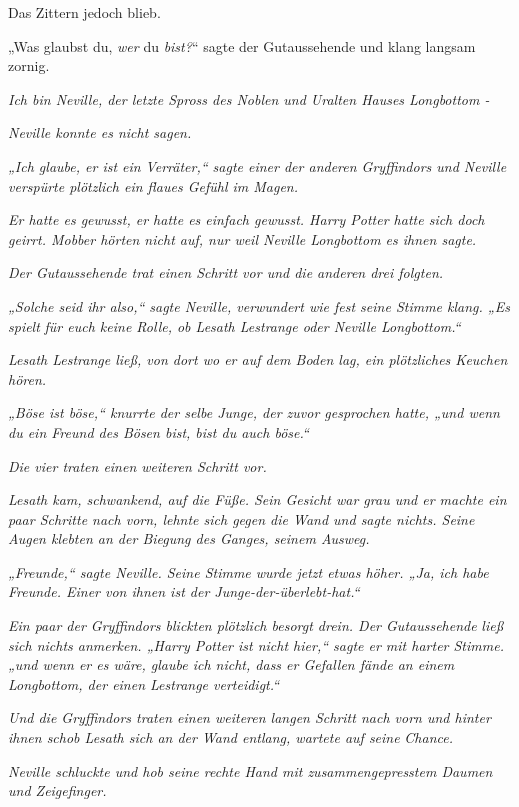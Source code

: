 {Das Zittern jedoch blieb.

„Was glaubst du, \emph{wer} du \emph{bist?}“ sagte der Gutaussehende und klang langsam zornig.

\emph{Ich bin Neville, der letzte Spross des Noblen und Uralten Hauses Longbottom -}

\emph{Neville konnte es nicht sagen.}

\emph{„Ich glaube, er ist ein} \emph{\emph{Verräter,}“ sagte einer der anderen Gryffindors und Neville verspürte plötzlich ein flaues Gefühl im Magen.}

\emph{Er hatte es gewusst, er hatte es einfach gewusst. Harry Potter hatte sich doch geirrt. Mobber hörten nicht auf, nur weil Neville Longbottom es ihnen sagte.}

\emph{Der Gutaussehende trat einen Schritt vor und die anderen drei folgten.}

\emph{„Solche seid ihr also,“ sagte Neville, verwundert wie fest seine Stimme klang. „Es spielt} \emph{für euch keine Rolle, ob Lesath Lestrange oder Neville Longbottom.“}

\emph{Lesath Lestrange ließ, von dort wo er auf dem Boden lag, ein plötzliches Keuchen hören.}

\emph{„Böse ist böse,“ knurrte der selbe Junge, der zuvor gesprochen hatte, „und wenn du ein Freund des Bösen bist, bist du auch böse.“}

\emph{Die vier traten einen weiteren Schritt vor.}

\emph{Lesath kam, schwankend, auf die Füße. Sein Gesicht war grau und er machte ein paar Schritte nach vorn, lehnte sich gegen die Wand und sagte nichts. Seine Augen klebten an der Biegung des Ganges, seinem Ausweg.}

\emph{„Freunde,“ sagte Neville. Seine Stimme wurde jetzt etwas höher. „Ja, ich habe Freunde. Einer von ihnen ist der Junge-der-überlebt-hat.“}

\emph{Ein paar der Gryffindors blickten plötzlich besorgt drein. Der Gutaussehende} \emph{ließ sich nichts anmerken. „Harry Potter ist nicht hier,“ sagte er mit harter Stimme. „und wenn er es wäre, glaube ich nicht, dass er Gefallen fände an einem Longbottom, der einen Lestrange verteidigt.“}

\emph{Und die Gryffindors traten einen weiteren langen Schritt nach vorn und hinter ihnen schob Lesath sich an der Wand entlang, wartete auf seine} \emph{Chance.}

\emph{Neville schluckte und hob seine rechte Hand mit zusammengepresstem Daumen und Zeigefinger.}

}
